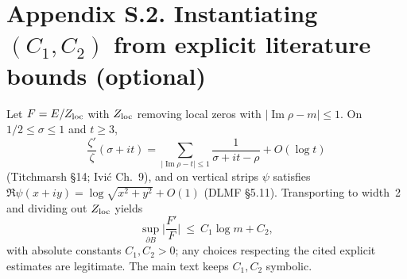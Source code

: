 \documentclass[11pt]{article}
\numberwithin{equation}{section}
\theoremstyle{remark}
\DeclareMathOperator{\Imag}{Im}
\begin{document}
\section*{Appendix S.2. Instantiating $(C_1,C_2)$ from explicit literature bounds (optional)}
Let $F=E/Z_{\rm loc}$ with $Z_{\rm loc}$ removing local zeros with $|\Imag\rho-m|\le 1$. On $1/2\le\sigma\le 1$ and $t\ge 3$,
\[
\frac{\zeta'}{\zeta}(\sigma+it)=\sum_{|\Imag\rho-t|\le 1}\frac{1}{\sigma+it-\rho}+O(\log t)
\]
(Titchmarsh §14; Ivi\'c Ch.~9), and on vertical strips $\psi$ satisfies $\Re\psi(x+iy)=\log\sqrt{x^2+y^2}+O(1)$ (DLMF §5.11). Transporting to width~2 and dividing out $Z_{\rm loc}$ yields
\[
\sup_{\partial B}\Big|\frac{F'}{F}\Big|\ \le\ C_1\log m + C_2,
\]
with absolute constants $C_1,C_2>0$; any choices respecting the cited explicit estimates are legitimate. The main text keeps $C_1,C_2$ symbolic.

\end{document}
